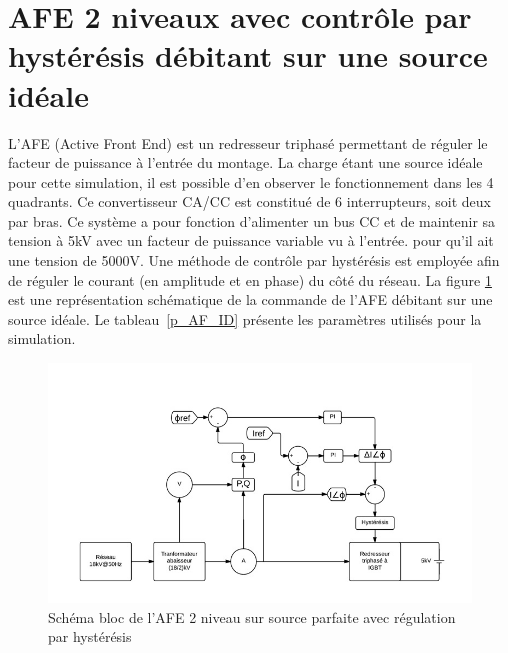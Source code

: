 \documentclass[11pt,letterpaper,final]{report}
\begin{document}
\clearpage
\section{AFE 2 niveaux avec contrôle par hystérésis débitant sur une source idéale}
L'AFE (Active Front End) est un redresseur triphasé permettant de réguler le facteur de puissance à l'entrée du montage. La charge étant une source idéale pour cette simulation, il est possible d'en observer le fonctionnement dans les 4 quadrants. Ce convertisseur CA/CC est constitué de 6 interrupteurs, soit deux par bras. Ce système a pour fonction d'alimenter un bus CC et de maintenir sa tension à 5kV avec un facteur de puissance variable vu à l'entrée. pour qu'il ait une tension de 5000V. Une méthode de contrôle par hystérésis est employée afin de réguler le courant (en amplitude et en phase) du côté du réseau. La figure \ref{AFE} est une représentation schématique de la commande de l'AFE débitant sur une source idéale. Le tableau~\ref{p_AF_ID} présente les paramètres utilisés pour la simulation.

\begin{figure}[htb]
\centering
\includegraphics[scale=0.5]{Fig/AFEIDEAL/AFE.jpg}
\caption{Schéma bloc de l'AFE 2 niveau sur source parfaite avec régulation par hystérésis}
\label{AFE}
\end{figure}
\end{document}
